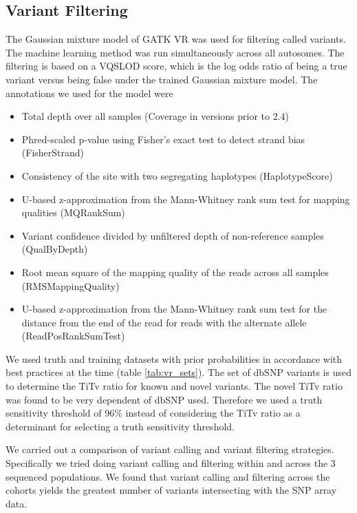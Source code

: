 \subsection{Variant Filtering}
The Gaussian mixture model of \gls{GATK} \gls{VR} was used for filtering called variants. The machine learning method was run simultaneously across all autosomes. The filtering is based on a \gls{VQSLOD} score, which is the log odds ratio of being a true variant versus being false under the trained Gaussian mixture model. The annotations we used for the model were
\begin{itemize}
\item Total depth over all samples (Coverage in versions prior to 2.4)
\item Phred-scaled p-value using Fisher’s exact test to detect strand bias (FisherStrand)
\item Consistency of the site with two segregating haplotypes (HaplotypeScore)
\item U-based z-approximation from the Mann-Whitney rank sum test for mapping qualities (MQRankSum)
\item Variant confidence divided by unfiltered depth of non-reference samples (QualByDepth)
\item Root mean square of the mapping quality of the reads across all samples (RMSMappingQuality)
\item U-based z-approximation from the Mann-Whitney rank sum test for the distance from the end of the read for reads with the alternate allele (ReadPosRankSumTest)
\end{itemize}

We used truth and training datasets with prior probabilities in accordance with best practices at the time (table \ref{tab:vr_sets}). The set of \gls{dbSNP}\cite{Wheeler01012007} variants is used to determine the \gls{TiTv} ratio for known and novel variants. The novel \gls{TiTv} ratio was found to be very dependent of dbSNP used. Therefore we used a truth sensitivity threshold of 96\% instead of considering the \gls{TiTv} ratio as a determinant for selecting a truth sensitivity threshold.


We carried out a comparison of variant calling and variant filtering strategies. Specifically we tried doing variant calling and filtering within and across the 3 sequenced populations. We found that variant calling and filtering across the cohorts yields the greatest number of variants intersecting with the SNP array data.

